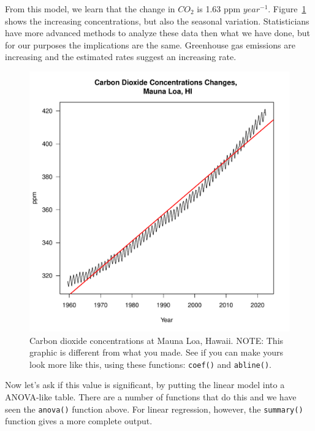 \documentclass{tufte-handout}\usepackage[]{graphicx}\usepackage[]{color}
\makeatletter
\def\maxwidth{ %
  \ifdim\Gin@nat@width>\linewidth
    \linewidth
  \else
    \Gin@nat@width
  \fi
}
\newenvironment{knitrout}{}{} %
\makeatother
\begin{document}
From this model, we learn that the change in $CO_2$ is 1.63 ppm $year^{-1}$. Figure~\ref{fig:maunaloa} shows the increasing concentrations, but also the seasonal variation. Statisticians have more advanced methods to analyze these data then what we have done, but for our purposes the implications are the same.  Greenhouse gas emissions are increasing and the estimated rates suggest an increasing rate.

\begin{figure}
\label{fig:maunaloa}
\caption{Carbon dioxide concentrations at Mauna Loa, Hawaii. NOTE: This graphic is different from what you made. See if you can make yours look more like this, using these functions: \texttt{coef()} and \texttt{abline()}.}
\begin{knitrout}
\color{fgcolor}
\includegraphics[width=\maxwidth]{figure/unnamed-chunk-54-1} 
\end{knitrout}
\end{figure}

Now let's ask if this value is significant, by putting the linear model into a ANOVA-like table. There are a number of functions that do this and we have seen the \texttt{anova()} function above. For linear regression, however, the \texttt{summary()} function gives a more complete output.
\end{document}
